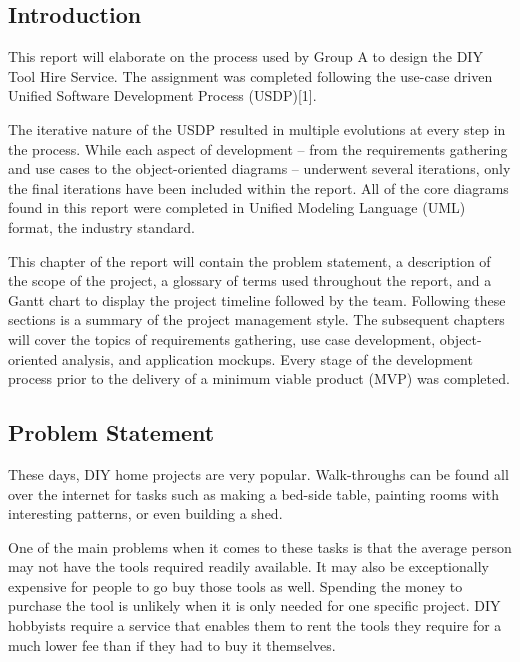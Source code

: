 \documentclass[fontsize=11pt]{extarticle}
\numberwithin{figure}{section} %
\numberwithin{table}{section}%
\begin{document}
\hypertarget{introduction}{%
\subsection{Introduction}\label{introduction}}

This report will elaborate on the process used by Group A to design the
DIY Tool Hire Service. The assignment was completed following the
use-case driven Unified Software Development Process (USDP){[}1{]}.

The iterative nature of the USDP resulted in multiple evolutions at
every step in the process. While each aspect of development -- from the
requirements gathering and use cases to the object-oriented diagrams --
underwent several iterations, only the final iterations have been
included within the report. All of the core diagrams found in this
report were completed in Unified Modeling Language (UML) format, the
industry standard.

This chapter of the report will contain the problem statement, a
description of the scope of the project, a glossary of terms used
throughout the report, and a Gantt chart to display the project timeline
followed by the team. Following these sections is a summary of the
project management style. The subsequent chapters will cover the topics
of requirements gathering, use case development, object-oriented
analysis, and application mockups. Every stage of the development
process prior to the delivery of a minimum viable product (MVP) was
completed.

\hypertarget{problem-statement}{%
\subsection{Problem Statement}\label{problem-statement}}

These days, DIY home projects are very popular. Walk-throughs can be
found all over the internet for tasks such as making a bed-side table,
painting rooms with interesting patterns, or even building a shed.

One of the main problems when it comes to these tasks is that the
average person may not have the tools required readily available. It may
also be exceptionally expensive for people to go buy those tools as
well. Spending the money to purchase the tool is unlikely when it is
only needed for one specific project. DIY hobbyists require a service
that enables them to rent the tools they require for a much lower fee
than if they had to buy it themselves.
\end{document}
